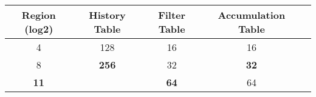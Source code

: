 \begin{table}[htbp]
  \caption{\emph{}}
  \centering
  \begin{tabular}{|c|c|c|c|c|}
    \hline
    \textbf{Region (log2)} & \textbf{History Table} & \textbf{Filter Table} & \textbf{Accumulation Table} \\ \hline
    4  & 128 & 16 & 16 \\ \hline
    8  & \textbf{256} & 32&  \textbf{32}\\ \hline
    \textbf{11} &     & \textbf{64}&  64\\ \hline
  \end{tabular}
  \label{tab:smssettings}
\end{table}







